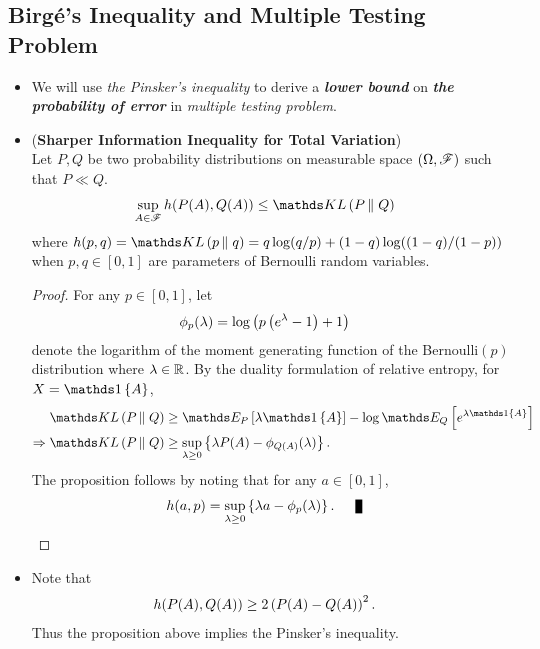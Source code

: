 \documentclass[11pt]{article}
\begin{document}
\subsection{Birg{\'e}'s Inequality and Multiple Testing Problem}
\begin{itemize}
\item \begin{remark}
We will use \emph{the Pinsker's inequality} to derive a \emph{\textbf{lower bound}} on \emph{\textbf{the probability of error}} in \emph{multiple testing problem}.
\end{remark}

\item \begin{proposition} (\textbf{Sharper Information Inequality for Total Variation}) \citep{boucheron2013concentration}\\
Let $P, Q$ be two probability distributions on measurable space $(\Omega, {\mathscr F})$ such that $P \ll Q$.
\begin{align}
\sup_{A \in \srF} h(P(A), Q(A)) &\le \kl{P}{Q} \label{ineqn: total_variation_inequality_duality}
\end{align} where $h(p, q) = \kl{p}{q} = q\log(q/p) + (1-q)\log((1-q)/(1-p))$ when $p,q \in [0, 1]$ are parameters of Bernoulli random variables. 
\end{proposition}
\begin{proof}
For any $p \in [0, 1]$, let 
\begin{align*}
\phi_{p}(\lambda) &= \log\left(p\left(e^{\lambda} - 1\right) + 1\right)
\end{align*} denote the logarithm of the moment generating function of the Bernoulli$(p)$ distribution where $\lambda \in {\mathbb R}$. By the duality formulation of relative entropy, for $X = \ind{A}$,
\begin{align*}
\kl{P}{Q} &\ge \E{P}{\lambda \ind{A}} - \log\E{Q}{e^{\lambda \ind{A}}} \\
\Rightarrow \kl{P}{Q}  &\ge \sup_{\lambda \ge 0}\set{\lambda P(A) - \phi_{Q(A)}(\lambda) }.
\end{align*} The proposition follows by noting that for any $a \in [0, 1]$, 
\begin{align*}
h(a, p) &= \sup_{\lambda\ge 0}\set{\lambda a - \phi_{p}(\lambda)}. \qed
\end{align*}
\end{proof}

\item \begin{remark}
Note that
\begin{align*}
h(P(A), Q(A)) &\ge 2\left(P(A) - Q(A)\right)^2.
\end{align*} Thus the proposition above implies the Pinsker's inequality.
\end{remark}



\end{itemize}
\end{document}
